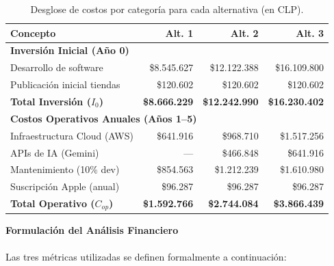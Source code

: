 \documentclass[12pt]{article}
\begin{document}
\begin{table}[h!]
    \centering
    \renewcommand{\arraystretch}{1.4}
    \begin{tabular}{|m{4.5cm}|r|r|r|}
        \hline
        \rowcolor[HTML]{EFEFEF}
        \textbf{Concepto} & \textbf{Alt. 1} & \textbf{Alt. 2} & \textbf{Alt. 3} \\ \hline
        \multicolumn{4}{|l|}{\cellcolor[HTML]{E3F2FD}\textbf{Inversión Inicial (Año 0)}} \\ \hline
        Desarrollo de software & \$8.545.627 & \$12.122.388 & \$16.109.800 \\ \hline
        Publicación inicial tiendas & \$120.602 & \$120.602 & \$120.602 \\ \hline
        \rowcolor[HTML]{E8F5E9}
        \textbf{Total Inversión ($I_0$)} & \textbf{\$8.666.229} & \textbf{\$12.242.990} & \textbf{\$16.230.402} \\ \hline
        \multicolumn{4}{|l|}{\cellcolor[HTML]{FFF3E0}\textbf{Costos Operativos Anuales (Años 1--5)}} \\ \hline
        Infraestructura Cloud (AWS) & \$641.916 & \$968.710 & \$1.517.256 \\ \hline
        APIs de IA (Gemini) & --- & \$466.848 & \$641.916 \\ \hline
        Mantenimiento (10\% dev) & \$854.563 & \$1.212.239 & \$1.610.980 \\ \hline
        Suscripción Apple (anual) & \$96.287 & \$96.287 & \$96.287 \\ \hline
        \rowcolor[HTML]{FFF3E0}
        \textbf{Total Operativo ($C_{op}$)} & \textbf{\$1.592.766} & \textbf{\$2.744.084} & \textbf{\$3.866.439} \\ \hline
    \end{tabular}
    \caption{Desglose de costos por categoría para cada alternativa (en CLP).}
    \label{tab:desglose_costos}
\end{table}
\newpage

\textbf{Formulación del Análisis Financiero}
\\\\
Las tres métricas utilizadas se definen formalmente a continuación:
\end{document}
